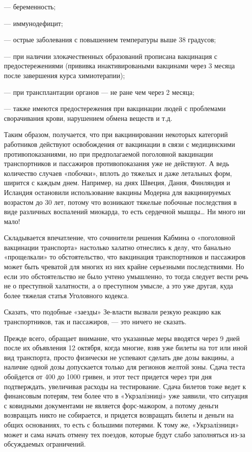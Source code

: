 — беременность;

— иммунодефицит;

— острые заболевания с повышением температуры выше 38 градусов;

— при наличии злокачественных образований прописана вакцинация с
предостережениями (прививка инактивироваными вакцинами через 3 месяца после
завершения курса химиотерапии);

— при трансплантации органов — не ране чем через 2 месяца;

— также имеются предостережения при вакцинации людей с проблемами сворачивания
крови, нарушением обмена веществ и т.д.

Таким образом, получается, что при вакцинировании некоторых категорий
работников действуют освобождения от вакцинации в связи с медицинскими
противопоказаниями, но при предполагаемой поголовной вакцинации транспортников
и пассажиров противопоказания уже не действуют. А ведь количество случаев
«побочки», вплоть до тяжелых и даже летальных форм, ширится с каждым днем.
Например, на днях Швеция, Дания, Финляндия и Исландия остановили использование
вакцины Модерна для вакцинируемых возрастом до 30 лет, потому что возникают
тяжелые побочные последствия в виде различных воспалений миокарда, то есть
сердечной мышцы… Ни много ни мало!

Складывается впечатление, что сочинители решения Кабмина о «поголовной
вакцинации транспорта» настолько халатно отнеслись к делу, что банально
«прощелкали» то обстоятельство, что вакцинация транспортников и пассажиров
может быть чреватой для многих из них крайне серьезными последствиями. Но если
это обстоятельство не было учтено умышленно, то тогда следует вести речь не о
преступной халатности, а о преступном умысле, а это уже другая, куда более
тяжелая статья Уголовного кодекса.

Сказать, что подобные «заезды» Зе-власти вызвали резкую реакцию как
транспортников, так и пассажиров, — это ничего не сказать.

Прежде всего, обращает внимание, что указанные меры вводятся через 9 дней после
их объявления 12 октября, когда многие, взяв уже билеты на тот или иной вид
транспорта, просто физически не успевают сделать две дозы вакцины, а наличие
одной дозы допускается только для регионов желтой зоны. Сдача теста обойдется
от 400 до 1000 гривен, и этот тест придется через три дня подтверждать,
увеличивая расходы на тестирование. Сдача билетов тоже ведет к финансовым
потерям, тем более что в «Укрзалізниці» уже заявили, что ситуация с ковидными
документами не является форс-мажором, а потому деньги возвращать никто не
собирается, и придется возвращать билеты и деньги на общих основаниях, то есть
с большими потерями. К тому же, «Укрзалізниця» может и сама начать отмену тех
поездов, которые будут слабо заполняться из-за обсуждаемых ограничений.

